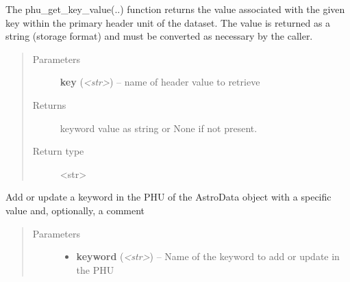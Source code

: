\documentclass[letterpaper,10pt,english]{sphinxmanual}
\begin{document}
\begin{fulllineitems}
\begin{fulllineitems}
\begin{quote}
\begin{description}
\begin{itemize}
\end{itemize}

\end{description}\end{quote}

\end{fulllineitems}


\begin{fulllineitems}
\label{astro_class:astrodata.AstroData.AstroData.phu_get_key_value}
The phu\_get\_key\_value(..) function returns the value associated 
with the given key within the primary header unit of the dataset.
The value is returned as a string (storage format) and must be 
converted as necessary by the caller.
\begin{quote}\begin{description}
\item[{Parameters}] \leavevmode
\textbf{key} (\emph{\textless{}str\textgreater{}}) -- name of header value to retrieve

\item[{Returns}] \leavevmode
keyword value as string or None if not present.

\item[{Return type}] \leavevmode
\textless{}str\textgreater{}

\end{description}\end{quote}

\end{fulllineitems}


\begin{fulllineitems}
\label{astro_class:astrodata.AstroData.AstroData.phu_set_key_value}
Add or update a keyword in the PHU of the AstroData object with a
specific value and, optionally, a comment
\begin{quote}\begin{description}
\item[{Parameters}] \leavevmode\begin{itemize}
\item {} 
\textbf{keyword} (\emph{\textless{}str\textgreater{}}) -- Name of the keyword to add or update in the PHU


\end{itemize}
\end{description}
\end{quote}
\end{fulllineitems}
\end{fulllineitems}
\end{document}
